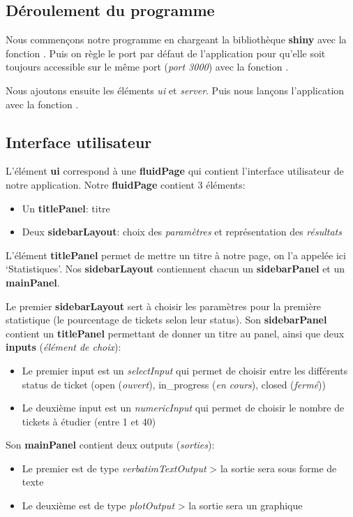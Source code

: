 \documentclass[12pt, a4paper]{article}
\begin{document}
\subsection*{Déroulement du programme}
\label{subsec:deroulement}

Nous commençons notre programme en chargeant la bibliothèque \textbf{shiny} avec la fonction .
Puis on règle le port par défaut de l'application pour qu'elle soit toujours accessible sur le même port (\textit{port 3000})
avec la fonction .
\bigskip

Nous ajoutons ensuite les éléments \textit{ui} et \textit{server}.
Puis nous lançons l'application avec la fonction .

\subsection*{Interface utilisateur}

L'élément \textbf{ui} correspond à une \textbf{fluidPage} qui contient l'interface utilisateur de notre application.
Notre \textbf{fluidPage} contient 3 éléments:
\begin{itemize}
    \item Un \textbf{titlePanel}: titre
    \item Deux \textbf{sidebarLayout}: choix des \textit{paramètres} et représentation des \textit{résultats}
\end{itemize}
L'élément \textbf{titlePanel} permet de mettre un titre à notre page, on l'a appelée ici `Statistiques'.
Nos \textbf{sidebarLayout} contiennent chacun un \textbf{sidebarPanel} et un \textbf{mainPanel}.
\bigskip

Le premier \textbf{sidebarLayout} sert à choisir les paramètres pour la première statistique (le pourcentage de tickets selon leur status).
Son \textbf{sidebarPanel} contient un \textbf{titlePanel} permettant de donner un titre au panel, ainsi que deux \textbf{inputs} (\textit{élément de choix}):
\begin{itemize}
    \item Le premier input est un \textit{selectInput} qui permet de choisir entre les différents status de ticket
    (open (\textit{ouvert}), in\_progress (\textit{en cours}), closed (\textit{fermé}))
    \item Le deuxième input est un \textit{numericInput} qui permet de choisir le nombre de tickets à étudier (entre 1 et 40)
\end{itemize}
Son \textbf{mainPanel} contient deux outputs (\textit{sorties}):
\begin{itemize}
    \item Le premier est de type \textit{verbatimTextOutput} > la sortie sera sous forme de texte
    \item Le deuxième est de type \textit{plotOutput} > la sortie sera un graphique
\end{itemize}
\bigskip
\end{document}
